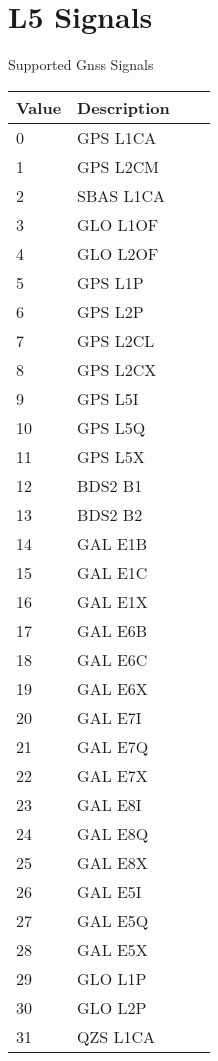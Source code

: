 \documentclass[9pt]{extarticle}
\numberwithin{table}{subsection}
\numberwithin{field}{subsection}
\begin{document}
\section{L5 Signals}
\label{sec:signals}
\begin{large}
Supported Gnss Signals
\end{large}
\begin{table}[h]
  \centering
  \begin{tabular}{llrl}
    \toprule
    Value & Description \\
    \midrule
    {0} & {GPS L1CA} \\
    {1} & {GPS L2CM} \\
    {2} & {SBAS L1CA} \\
    {3} & {GLO L1OF} \\
    {4} & {GLO L2OF} \\
    {5} & {GPS L1P} \\
    {6} & {GPS L2P} \\
    {7} & {GPS L2CL} \\
    {8} & {GPS L2CX} \\
    {9} & {GPS L5I} \\
    {10} & {GPS L5Q} \\
    {11} & {GPS L5X} \\
    {12} & {BDS2 B1} \\
    {13} & {BDS2 B2} \\
    {14} & {GAL E1B} \\
    {15} & {GAL E1C} \\
    {16} & {GAL E1X} \\
    {17} & {GAL E6B} \\
    {18} & {GAL E6C} \\
    {19} & {GAL E6X} \\
    {20} & {GAL E7I} \\
    {21} & {GAL E7Q} \\
    {22} & {GAL E7X} \\
    {23} & {GAL E8I} \\
    {24} & {GAL E8Q} \\
    {25} & {GAL E8X} \\
    {26} & {GAL E5I} \\
    {27} & {GAL E5Q} \\
    {28} & {GAL E5X} \\
    {29} & {GLO L1P} \\
    {30} & {GLO L2P} \\
    {31} & {QZS L1CA} \\

\end{tabular}
\end{table}
\end{document}
